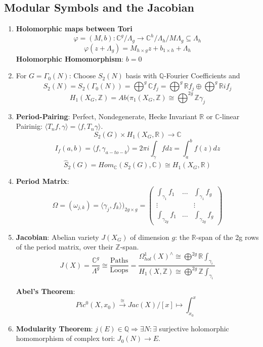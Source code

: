 \documentclass{article}
\newcommand{\Q}{\mathbb{Q}}
\newcommand{\R}{\mathbb{R}}
\newcommand{\C}{\mathbb{C}}
\newcommand{\Z}{\mathbb{Z}}
\newcommand{\ra}{\rightarrow}
\newcommand{\Ra}{\Rightarrow}
\newcommand{\raa}[1]{\overset{#1}{\longrightarrow}}
\begin{document}
\subsection{Modular Symbols and the Jacobian}
\begin{multicols}{2}
\begin{enumerate}
\item \textbf{Holomorphic maps between Tori} 
\[\varphi = (M,b): \C^g/\Lambda_g \ra \C^h/\Lambda_h/ M\Lambda_g \subseteq \Lambda_h\] 
\[\varphi(z + \Lambda_g) = M_{h \times g} z + b_{1 \times h} + \Lambda_h\]  
\textbf{Holomorphic Homomorphism}: $b = 0$


\item For $G = \Gamma_0(N)$: Choose $S_2(N)$ basis with $\Q$-Fourier Coefficients and 
\[S_2(N) = S_2(\Gamma_0(N)) = \bigoplus^g \C f_j = \bigoplus^{g} \R f_j \oplus \bigoplus^g \R i f_j\]
\[H_1(X_G,\Z) = Ab(\pi_1(X_G,\Z) \cong \bigoplus^{2g}\Z \gamma_j\]


\item \textbf{Period-Pairing}: Perfect, Nondegenerate, Hecke Invariant $\R$ or $\C$-linear Pairinig: $\langle T_nf,\gamma \rangle = \langle f, T_n\gamma \rangle$. 
\[S_2(G) \times H_1(X_G,\R) \ra \C\]
\[I_f(a,b) = \langle f, \gamma_{a-to-b}\rangle = 2\pi i \int_\gamma fdz = \int_a^b f(z) dz\]
\[\hat{S}_2(G) = Hom_\C(S_2(G),\C) \cong H_1(X_G,\R)\]

\item \textbf{Period Matrix}:
\[\Omega = (\omega_{j,k}) = \langle \gamma_j, f_k \rangle)_{2g \times g} = \left(\begin{array}{ccc} \int_{\gamma_1}f_1 & \ldots & \int_{\gamma_1} f_g \\ \vdots && \vdots \\ \int_{\gamma_{2g}} f_1 & \ldots & \int_{\gamma_{2g}} f_g\end{array}\right)\]

\item \textbf{Jacobian}:  Abelian variety $J(X_G)$ of dimension $g$: the $\R$-span of the 2g rows of the period matrix, over their $\Z$-span.
\[J(X) = \frac{\C^g}{\Lambda^g} \cong \frac{\textrm{Paths}}{\textrm{Loops}} = \frac{\Omega_{hol}^1(X)^{\wedge} \cong \bigoplus^{2g} \R\int_{\gamma_i}}{H_1(X,\Z) \cong \bigoplus^{2g} \Z \int_{\gamma_i}}\]

\textbf{Abel's Theorem}:
\[ Pic^0(X,x_0) \raa{\cong} Jac(X)/ [x] \mapsto \int_{x_0}^x\]


\item \textbf{Modularity Theorem}: $j(E) \in \Q \Ra \exists N: \exists$ surjective holomorphic homomorphism of complex tori: $J_0(N) \ra E$.\\


\end{enumerate}
\end{multicols}
\end{document}
